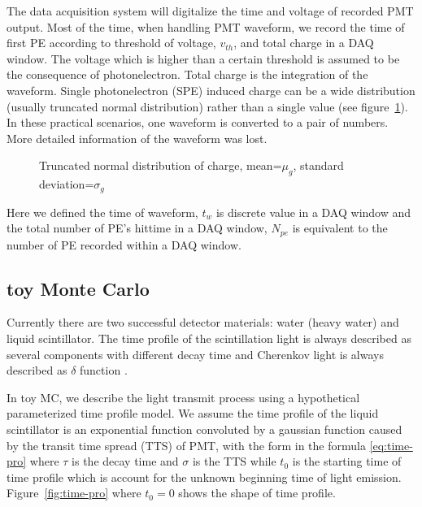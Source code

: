 The data acquisition system will digitalize the time and voltage of recorded PMT output. Most of the time, when handling PMT waveform, we record the time of first PE according to threshold of voltage, $v_{th}$, and total charge in a DAQ window. The voltage which is higher than a certain threshold is assumed to be the consequence of photonelectron. Total charge is the integration of the waveform. Single photonelectron (SPE) induced charge can be a wide distribution (usually truncated normal distribution) rather than a single value (see figure~\ref{fig:charge}). In these practical scenarios, one waveform is converted to a pair of numbers. More detailed information of the waveform was lost. 

\begin{minipage}[b]{1.\textwidth}
\begin{figure}[H]
    \centering
    \scalebox{0.4}{}
    \caption{\label{fig:charge} Truncated normal distribution of charge, mean=$\mu_{g}$, standard deviation=$\sigma_{g}$}
\end{figure}
\end{minipage}

Here we defined the time of waveform, $t_{w}$ is discrete value in a DAQ window and the total number of PE's hittime in a DAQ window, $N_{pe}$ is equivalent to the number of PE recorded within a DAQ window. 

\subsection{toy Monte Carlo}

Currently there are two successful detector materials: water (heavy water) and liquid scintillator. The time profile of the scintillation light is always described as several components with different decay time and Cherenkov light is always described as $\delta$ function \cite{ludhova_particle_2020}. 

In toy MC, we describe the light transmit process using a hypothetical parameterized time profile model. We assume the time profile of the liquid scintillator is an exponential function convoluted by a gaussian function \cite{li_separation_2016} caused by the transit time spread (TTS) of PMT, with the form in the formula \eqref{eq:time-pro} where $\tau$ is the decay time and $\sigma$ is the TTS while $t_{0}$ is the starting time of time profile which is account for the unknown beginning time of light emission. Figure~\ref{fig:time-pro} where $t_{0}=0$ shows the shape of time profile. 

